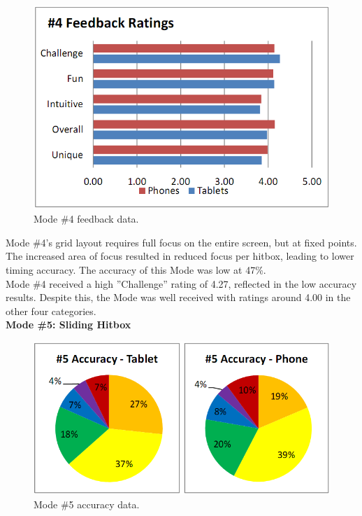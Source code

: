 \documentclass{sig-alternate}
\begin{document}
\begin{figure}[htb!]
	\begin{center}
		\includegraphics[width=1\linewidth]{figure_chart_rating_4}
	\end{center}
	\vspace{-12pt}
	\caption{Mode \#4 feedback data.}
	\label{fig:chart_rating_4}
\end{figure}

Mode \#4's grid layout requires full focus on the entire screen, but at fixed points. The increased area of focus resulted in reduced focus per hitbox, leading to lower timing accuracy. The accuracy of this Mode was low at 47\%.\\

Mode \#4 received a high ''Challenge'' rating of 4.27, reflected in the low accuracy results. Despite this, the Mode was well received with ratings around 4.00 in the other four categories.\\

\newpage
\noindent \textbf{Mode \#5: Sliding Hitbox}

\begin{figure}[htb!]
	\begin{center}
		\includegraphics[width=1\linewidth]{figure_chart_accuracy_5}
	\end{center}
	\vspace{-12pt}
	\caption{Mode \#5 accuracy data.}
	\label{fig:chart_accuracy_5}
\end{figure}
\end{document}
